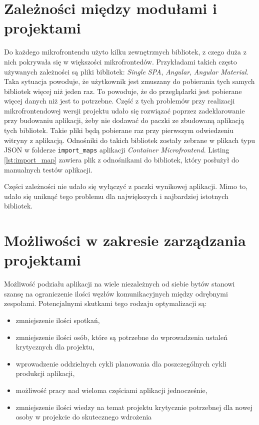 \documentclass{SGGW-thesis}
\begin{document}
  \section{Zależności między modułami i projektami}
  Do każdego mikrofrontendu użyto kilku zewnętrznych bibliotek, z czego duża z nich pokrywała się w większości mikrofrontedów. Przykładami takich często używanych zależności są pliki bibliotek: \textit{Single SPA}, \textit{Angular}, \textit{Angular Material}. Taka sytuacja powoduje, że użytkownik jest zmuszany do pobierania tych samych bibliotek więcej niż jeden raz. To powoduje, że do przeglądarki jest pobierane więcej danych niż jest to potrzebne. Część z tych problemów przy realizacji mikrofrontendowej wersji projektu udało się rozwiązać poprzez zadeklarowanie przy budowaniu aplikacji, żeby nie dodawać do paczki ze zbudowaną aplikacją tych bibliotek. Takie pliki będą pobierane raz przy pierwszym odwiedzeniu witryny z aplikacją. Odnośniki do takich bibliotek zostały zebrane w plikach typu JSON w folderze \lstinline{import_maps} aplikacji \textit{Container Microfrontend}. Listing \cref{lst:import_map} zawiera plik z odnośnikami do bibliotek, który posłużył do manualnych testów aplikacji.

  

  Części zależności nie udało się wyłączyć z paczki wynikowej aplikacji. Mimo to, udało się uniknąć tego problemu dla największych i najbardziej istotnych bibliotek.

  \pagebreak

  \section{Możliwości w zakresie zarządzania projektami}
  Możliwość podziału aplikacji na wiele niezależnych od siebie bytów stanowi szansę na ograniczenie ilości węzłów komunikacyjnych między odrębnymi zespołami. Potencjalnymi skutkami tego rodzaju optymalizacji są:

  \begin{itemize}
    \item zmniejszenie ilości spotkań,
    \item zmniejszenie ilości osób, które są potrzebne do wprowadzenia ustaleń krytycznych dla projektu,
    \item wprowadzenie oddzielnych cykli planowania dla poszczególnych cykli produkcji aplikacji,
    \item możliwość pracy nad wieloma częściami aplikacji jednocześnie,
    \item zmniejszenie ilości wiedzy na temat projektu krytycznie potrzebnej dla nowej osoby w projekcie do skutecznego wdrożenia
  \end{itemize}  
\end{document}
